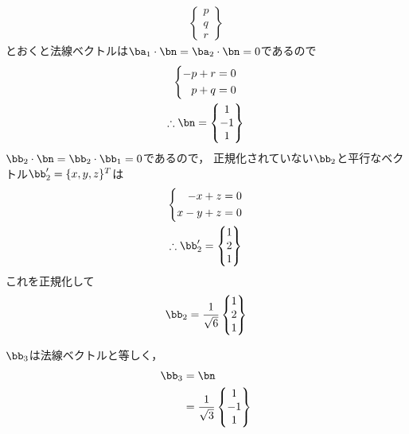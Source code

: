 \begin{ans*}
\begin{other*}
\begin{gather}
\begin{Bmatrix}
        p \\ q \\ r
      \end{Bmatrix}
    \end{gather}
    とおくと法線ベクトルは$\ba_1\cdot\bn=\ba_2\cdot\bn=0$であるので
    \begin{gather}
      \left\{
      \begin{aligned}
        -p + r &= 0 \\
        p + q &= 0
      \end{aligned}
      \right.
      \\
      \therefore \bn =
      \begin{Bmatrix}
        1 \\ -1 \\ 1
      \end{Bmatrix}
    \end{gather}
    $\bb_2\cdot\bn=\bb_2\cdot\bb_1=0$であるので，
    正規化されていない$\bb_2$と平行なベクトル$\bb'_2 = \{x, y, z\}^T$は
    \begin{gather}
      \left\{
      \begin{aligned}
        -x + z &= 0 \\
        x - y + z &= 0
      \end{aligned}
      \right.
      \\
      \therefore \bb'_2 =
      \begin{Bmatrix}
        1 \\ 2 \\ 1
      \end{Bmatrix}
    \end{gather}
    これを正規化して
    \begin{gather}
      \bb_2 = 
      \frac{1}{\sqrt{6}}
      \begin{Bmatrix}
        1 \\ 2 \\ 1
      \end{Bmatrix}
    \end{gather}

    $\bb_3$は法線ベクトルと等しく，
    \begin{align}
      \bb_3 
      &= \bn \\
      &= \frac{1}{\sqrt{3}}
      \begin{Bmatrix}
        1 \\ -1 \\ 1
      \end{Bmatrix}
    \end{align}
  \end{other*}
\end{ans*}


